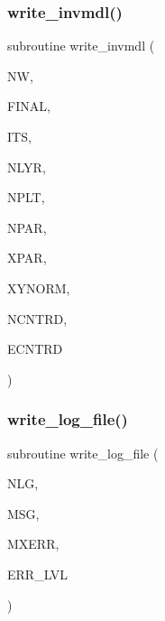 \subsubsection{\texorpdfstring{write\+\_\+invmdl()}{write\_invmdl()}}
{\footnotesize\ttfamily subroutine write\+\_\+invmdl (\begin{DoxyParamCaption}\item[{integer}]{NW,  }\item[{logical}]{F\+I\+N\+AL,  }\item[{integer}]{I\+TS,  }\item[{integer}]{N\+L\+YR,  }\item[{integer}]{N\+P\+LT,  }\item[{integer}]{N\+P\+AR,  }\item[{real, dimension(npar)}]{X\+P\+AR,  }\item[{real, dimension(nplt)}]{X\+Y\+N\+O\+RM,  }\item[{real(kind=ql)}]{N\+C\+N\+T\+RD,  }\item[{real(kind=ql)}]{E\+C\+N\+T\+RD }\end{DoxyParamCaption})}

\mbox{\label{Leroi__c_8f90_a78d7005f266cbaf5c3ec23db494d00ba}} 
\subsubsection{\texorpdfstring{write\+\_\+log\+\_\+file()}{write\_log\_file()}}
{\footnotesize\ttfamily subroutine write\+\_\+log\+\_\+file (\begin{DoxyParamCaption}\item[{integer}]{N\+LG,  }\item[{integer}]{M\+SG,  }\item[{integer}]{M\+X\+E\+RR,  }\item[{integer}]{E\+R\+R\+\_\+\+L\+VL }\end{DoxyParamCaption})}

\mbox{\label{Leroi__c_8f90_a050575d7cd77b6819922e9b6aa765af7}} 
